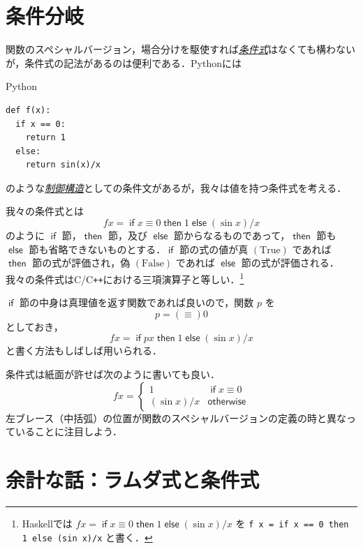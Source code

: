\documentclass[a4paper]{jsbook}
\newcommand{\programminglanguage}[1]{\textsf{#1}}
\newcommand{\clang}{\programminglanguage{C}}
\newcommand{\cxx}{\programminglanguage{C}\texttt{++}}
\newcommand{\haskell}{\programminglanguage{Haskell}}
\newcommand{\python}{\programminglanguage{Python}}
\newcommand{\keyword}[1]{{\underline{\emph{#1}}}}
\newcommand{\code}[1]{\texttt{#1}}
\newenvironment{pythoncode}{\begin{itembox}[r]{\python}}{\end{itembox}}
\newcommand{\mSpecialConst}[1]{\mathrm{#1}} %
\newcommand{\mTrue}{\mSpecialConst{True}}
\newcommand{\mFalse}{\mSpecialConst{False}}
\newcommand{\mKeyword}[1]{\mathsf{#1}}
\newcommand{\mIfKeyword}{\mKeyword{if}}
\newcommand{\mOtherwiseKeyword}{\mKeyword{otherwise}}
\newcommand{\mThenKeyword}{\mKeyword{then}}
\newcommand{\mElseKeyword}{\mKeyword{else}}
\DeclareMathOperator{\mIf}{\mIfKeyword}
\DeclareMathOperator{\mOtherwise}{\mOtherwiseKeyword}
\DeclareMathOperator{\mThen}{\mThenKeyword}
\DeclareMathOperator{\mElse}{\mElseKeyword}
\newcommand{\mIfThenElse}[3]{\mIf{#1}\mThen{#2}\mElse{#3}}
\begin{document}
\section{条件分岐}
\label{sec:if}

関数のスペシャルバージョン，場合分けを駆使すれば\keyword{条件式}はなくても構わないが，条件式の記法があるのは便利である．\python には
\begin{pythoncode}
\begin{verbatim}
def f(x):
  if x == 0:
    return 1
  else:
    return sin(x)/x
\end{verbatim}
\end{pythoncode}
のような\keyword{制御構造}としての条件文があるが，我々は値を持つ条件式を考える．

我々の条件式とは
\begin{equation}
fx
=\mIfThenElse{x\equiv0}{1}{{}(\sin x)/x}
\end{equation}
のように $\mIf$ 節，$\mThen$ 節，及び $\mElse$ 節からなるものであって，$\mThen$ 節も $\mElse$ 節も省略できないものとする．$\mIf$ 節の式の値が真 $(\mTrue)$ であれば $\mThen$ 節の式が評価され，偽 $(\mFalse)$ であれば $\mElse$ 節の式が評価される．我々の条件式は\clang/\cxx における三項演算子と等しい．\footnote{\haskell では $fx=\mIfThenElse{x\equiv0}{1}{{}(\sin x)/x}$ を \code{f x = if x == 0 then 1 else (sin x)/x} と書く．}

$\mIf$ 節の中身は真理値を返す関数であれば良いので，関数 $p$ を
\begin{equation}
p=(\equiv)0
\end{equation}
としておき，
\begin{equation}
fx=\mIfThenElse{px}{1}{{}(\sin x)/x}
\end{equation}
と書く方法もしばしば用いられる．

条件式は紙面が許せば次のように書いても良い．
\begin{equation}
fx=\begin{cases}
1&\mIf x\equiv0\\
(\sin x)/x&\mOtherwise
\end{cases}
\end{equation}
左ブレース（中括弧）の位置が関数のスペシャルバージョンの定義の時と異なっていることに注目しよう．

\section{余計な話：ラムダ式と条件式}
\end{document}
